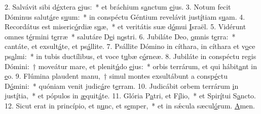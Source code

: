2. Salvávit sibi d\uline{é}xtera \uline{e}jus:~* et bráchium s\uline{a}nctum \uline{e}jus.
3. Notum fecit Dóminus salut\uline{á}re s\uline{u}um:~* in conspéctu Géntium revelávit just\uline{í}tiam s\uline{u}am.
4. Recordátus est miseric\uline{ó}rdiæ s\uline{u}æ,~* et veritátis suæ d\uline{ó}mui \uline{I}sraël.
5. Vidérunt omnes t\uline{é}rmini t\uline{e}rræ~* salutáre D\uline{e}i n\uline{o}stri.
6. Jubiláte Deo, \uline{o}mnis t\uline{e}rra:~* cantáte, et exsult\uline{á}te, et ps\uline{á}llite.
7. Psállite Dómino in cíthara, in cíthara et v\uline{o}ce ps\uline{a}lmi:~* in tubis ductílibus, et voce t\uline{u}bæ c\uline{ó}rneæ.
8. Jubiláte in conspéctu regis Dómini:~† moveátur mare, et plenit\uline{ú}do \uline{e}jus:~* orbis terrárum, et qui hábit\uline{a}nt in \uline{e}o.
9. Flúmina plaudent manu,~† simul montes exsultábunt a consp\uline{é}ctu D\uline{ó}mini:~* quóniam venit judic\uline{á}re t\uline{e}rram.
10. Judicábit orbem terrárum \uline{i}n just\uline{í}tia,~* et pópulos in \uline{æ}quit\uline{á}te.
11. Glória P\uline{a}tri, et F\uline{í}lio,~* et Spir\uline{í}tui S\uline{a}ncto.
12. Sicut erat in princípio, et n\uline{u}nc, et s\uline{e}mper,~* et in sǽcula sæcul\uline{ó}rum. \uline{A}men.

